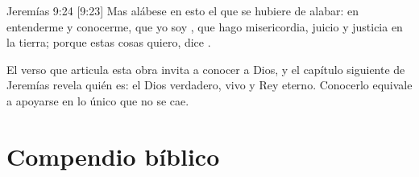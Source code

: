 \begin{verso}{Jeremías 9:24 [9:23]}
Mas alábese en esto el que se hubiere de alabar: en entenderme y conocerme, que yo soy \SENOR{}, que hago misericordia, juicio y justicia en la tierra; porque estas cosas quiero, dice \SENOR{}.
\end{verso}

El verso que articula esta obra invita a conocer a Dios, y el capítulo siguiente de Jeremías revela quién es: el Dios verdadero, vivo y Rey eterno. Conocerlo equivale a apoyarse en lo único que no se cae.

\section*{Compendio bíblico}
